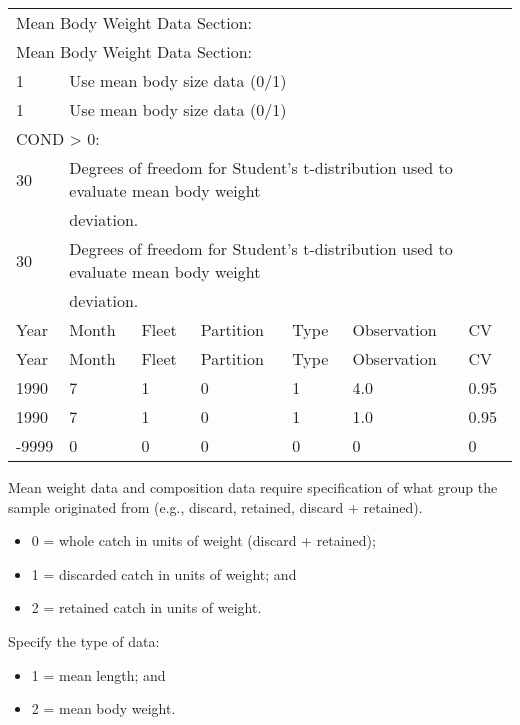 \begin{center}
	\begin{tabular}{p{1.75cm} p{1.75cm} p{1.75cm} p{1.75cm} p{1.75cm} p{2cm} p{2.8cm}}
		\multicolumn{7}{l}{Mean Body Weight Data Section:} \\
		\multicolumn{7}{l}{Mean Body Weight Data Section:} \\
		\hline
		1  & \multicolumn{6}{l}{Use mean body size data (0/1)} \Tstrut\Bstrut\\
		1  & \multicolumn{6}{l}{Use mean body size data (0/1)} \Tstrut\Bstrut\\
		\hline
		\multicolumn{7}{l}{COND > 0:}\Tstrut\\
		30 & \multicolumn{6}{l}{Degrees of freedom for Student's t-distribution used to evaluate mean body weight} \\
		  & \multicolumn{6}{l}{deviation.} \Bstrut\\
		30 & \multicolumn{6}{l}{Degrees of freedom for Student's t-distribution used to evaluate mean body weight} \\
		  & \multicolumn{6}{l}{deviation.} \Bstrut\\
		\hline
		Year & Month & Fleet & Partition & Type & Observation & CV \Tstrut\Bstrut\\
		Year & Month & Fleet & Partition & Type & Observation & CV \Tstrut\Bstrut\\
		\hline
		1990  & 7 & 1 & 0 & 1 & 4.0 & 0.95 \Tstrut\\
		1990  & 7 & 1 & 0 & 1 & 1.0 & 0.95 \\
		-9999 & 0 & 0 & 0 & 0 & 0   & 0 \Bstrut\\
		\hline
	\end{tabular}
\end{center}


Mean weight data and composition data require specification of what group the sample originated from (e.g., discard, retained, discard + retained).
\begin{itemize}
	\item 0 = whole catch in units of weight (discard + retained);
	\item 1 = discarded catch in units of weight; and
	\item 2 = retained catch in units of weight.
\end{itemize}

Specify the type of data:
\begin{itemize}
	\item 1 = mean length; and
	\item 2 = mean body weight.
\end{itemize}

